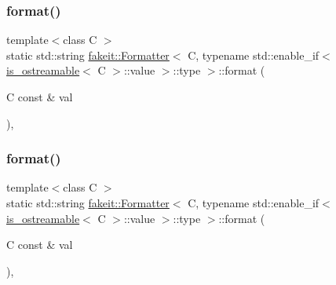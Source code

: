 \subsubsection{\texorpdfstring{format()}{format()}\hspace{0.1cm}{\footnotesize\ttfamily [5/9]}}
{\footnotesize\ttfamily template$<$class C $>$ \\
static std\+::string \mbox{\hyperlink{structfakeit_1_1Formatter}{fakeit\+::\+Formatter}}$<$ C, typename std\+::enable\+\_\+if$<$ \mbox{\hyperlink{classfakeit_1_1is__ostreamable}{is\+\_\+ostreamable}}$<$ C $>$\+::value $>$\+::type $>$\+::format (\begin{DoxyParamCaption}\item[{C const \&}]{val }\end{DoxyParamCaption})\hspace{0.3cm}{\ttfamily [inline]}, {\ttfamily [static]}}

\mbox{\label{structfakeit_1_1Formatter_3_01C_00_01typename_01std_1_1enable__if_3_01is__ostreamable_3_01C_01_4_1_1value_01_4_1_1type_01_4_af196fc780a3f1cfe986246af4c65a718}} 
\subsubsection{\texorpdfstring{format()}{format()}\hspace{0.1cm}{\footnotesize\ttfamily [6/9]}}
{\footnotesize\ttfamily template$<$class C $>$ \\
static std\+::string \mbox{\hyperlink{structfakeit_1_1Formatter}{fakeit\+::\+Formatter}}$<$ C, typename std\+::enable\+\_\+if$<$ \mbox{\hyperlink{classfakeit_1_1is__ostreamable}{is\+\_\+ostreamable}}$<$ C $>$\+::value $>$\+::type $>$\+::format (\begin{DoxyParamCaption}\item[{C const \&}]{val }\end{DoxyParamCaption})\hspace{0.3cm}{\ttfamily [inline]}, {\ttfamily [static]}}

